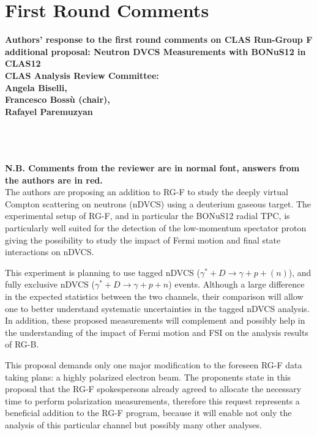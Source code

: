 \chapter{First Round Comments}

{\bf Authors' response to the first round comments on CLAS Run-Group F 
additional proposal: Neutron DVCS Measurements with BONuS12 in CLAS12}\\

{\center \bf CLAS Analysis Review Committee:\\Angela Biselli,\\ Francesco 
Boss\`u (chair),\\ Rafayel Paremuzyan\\}

\def \rarr {\ensuremath{\rightarrow}}
~\\
~\\
~\\

{\bf N.B. Comments from the reviewer are in normal font, answers from the authors are in red.} \\

The authors are proposing an addition to RG-F to study the deeply virtual 
Compton scattering on neutrons (nDVCS) using a deuterium gaseous target. The 
experimental setup of RG-F, and in particular the BONuS12 radial TPC, is 
particularly well suited for the detection of the low-momentum spectator proton 
giving the possibility to study the impact of Fermi motion and final state 
interactions on nDVCS.
 
This experiment is planning to use tagged nDVCS ($\gamma^{*} + D \rarr \gamma + 
p + (n)$), and fully exclusive nDVCS ($\gamma^{*} + D \rarr \gamma + p + n$) 
events. Although a large difference in the expected statistics between the two 
channels, their comparison will allow one to better understand systematic 
uncertainties in the tagged nDVCS analysis. In addition, these proposed 
measurements will complement and possibly help in the understanding of the 
impact of Fermi motion and FSI on the analysis results of RG-B.
 
This proposal demands only one major modification to the foreseen RG-F data 
taking plans: a highly polarized electron beam. The proponents state in this 
proposal that the RG-F spokespersons already agreed to allocate the necessary 
time to perform polarization measurements, therefore this request represents a 
beneficial addition to the RG-F program, because it will enable not only the 
analysis of this particular channel but possibly many other analyses.
  
